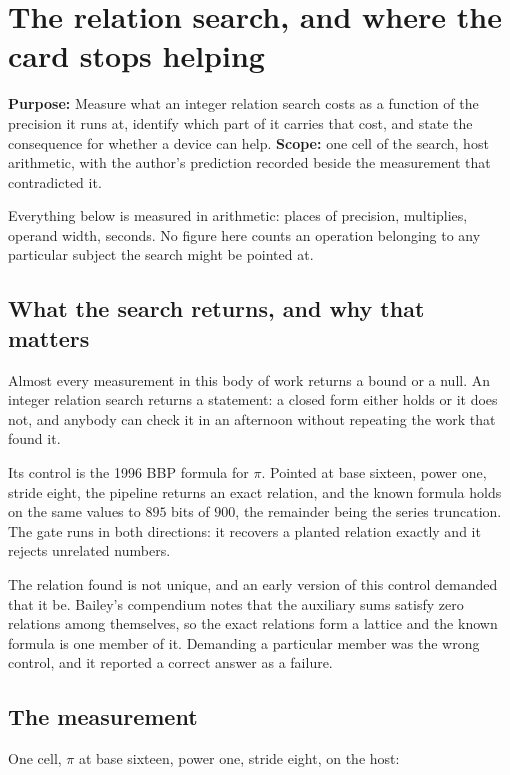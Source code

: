 \chapter{The relation search, and where the card stops helping}

\textbf{Purpose:} Measure what an integer relation search costs as a function of the precision it runs at, identify which part of it carries that cost, and state the consequence for whether a device can help. \textbf{Scope:} one cell of the search, host arithmetic, with the author's prediction recorded beside the measurement that contradicted it.

Everything below is measured in arithmetic: places of precision, multiplies, operand width, seconds. No figure here counts an operation belonging to any particular subject the search might be pointed at.

\section{What the search returns, and why that matters}

Almost every measurement in this body of work returns a bound or a null. An integer relation search returns a statement: a closed form either holds or it does not, and anybody can check it in an afternoon without repeating the work that found it.

Its control is the 1996 BBP formula for \(\pi\). Pointed at base sixteen, power one, stride eight, the pipeline returns an exact relation, and the known formula holds on the same values to \(895\) bits of \(900\), the remainder being the series truncation. The gate runs in both directions: it recovers a planted relation exactly and it rejects unrelated numbers.

The relation found is not unique, and an early version of this control demanded that it be. Bailey's compendium notes that the auxiliary sums satisfy zero relations among themselves, so the exact relations form a lattice and the known formula is one member of it. Demanding a particular member was the wrong control, and it reported a correct answer as a failure.

\section{The measurement}

One cell, \(\pi\) at base sixteen, power one, stride eight, on the host:

